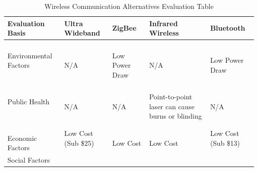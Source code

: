 \documentclass[12pt]{article}
\begin{document}
\begin{table}[h!]
\centering
\caption{Wireless Communication Alternatives Evaluation Table}
\begin{tabular}{| l | l | l | l | l |}
\hline
\parbox{0.17\linewidth}{\centering Evaluation Basis} & \parbox{0.180\linewidth}{\centering 
Ultra Wideband
} & \parbox{0.180\linewidth}{\centering 
ZigBee
} & \parbox{0.180\linewidth}{\centering 
Infrared Wireless
} & \parbox{0.180\linewidth}{\centering 
Bluetooth
}\\
\hline
\parbox{0.17\linewidth}{\raggedleft Environmental Factors} &
\parbox{0.180\linewidth}{\hfill \\
N/A
\\} & 
\parbox{0.180\linewidth}{\hfill \\
Low Power Draw
\\} & 
\parbox{0.180\linewidth}{\hfill \\
N/A
\\} & \parbox{0.180\linewidth}{\hfill \\
Low Power Draw
\\}\\ \hline
\parbox{0.17\linewidth}{\raggedleft Public Health} & 
\parbox{0.180\linewidth}{\hfill \\
N/A
\\} & 
\parbox{0.180\linewidth}{\hfill \\
N/A
\\} & 
\parbox{0.180\linewidth}{\hfill \\
Point-to-point laser can cause burns or blinding
\\} & \parbox{0.180\linewidth}{\hfill \\
N/A
\\}\\ \hline
\parbox{0.17\linewidth}{\raggedleft \hfill\\ Economic Factors\\} &
\parbox{0.180\linewidth}{\hfill \\
Low Cost (Sub \$25)
\\} & 
\parbox{0.180\linewidth}{\hfill \\
Low Cost
\\} & 
\parbox{0.180\linewidth}{\hfill \\
Low Cost
\\} & \parbox{0.180\linewidth}{\hfill \\
Low Cost (Sub \$13)
\\}\\ \hline
\parbox{0.17\linewidth}{\raggedleft Social Factors} & 

\end{tabular}
\end{table}
\end{document}
